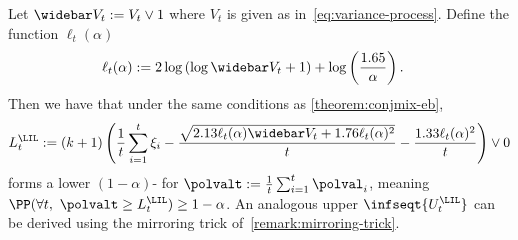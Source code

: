 \begin{proposition}\label{proposition:lil-eb}
  Let $\widebar V_t := V_t \lor 1$ where $V_t$ is given as in~\eqref{eq:variance-process}.
  Define the function $\ell_t(\alpha)$
  \begin{align}
    \ell_t(\alpha) &:= 2 \log \left ( \log \widebar V_t + 1 \right ) + \log \left ( \frac{1.65}{\alpha} \right ).
  \end{align}
  Then we have that under the same conditions as \cref{theorem:conjmix-eb},
  \begin{equation}\label{eq:lil-lower}
    L_t^\LIL := (k + 1) \left ( \frac{1}{t}\sum_{i=1}^t \xi_i - \frac{\sqrt{2.13 \ell_t(\alpha) \widebar V_t + 1.76 \ell_t(\alpha)^2}}{t} - \frac{1.33 \ell_t(\alpha)^2}{t} \right ) \lor 0 \\
  \end{equation}
  forms a lower $(1-\alpha)$-\cs{} for $\polvalt := \frac{1}{t} \sum_{i=1}^t \polval_i$, meaning $\PP(\forall t,\ \polvalt \geq L_t^\LIL) \geq 1-\alpha$. An analogous upper \cs{} $\infseqt{U_t^\LIL}$ can be derived using the mirroring trick of~\cref{remark:mirroring-trick}.
\end{proposition}
